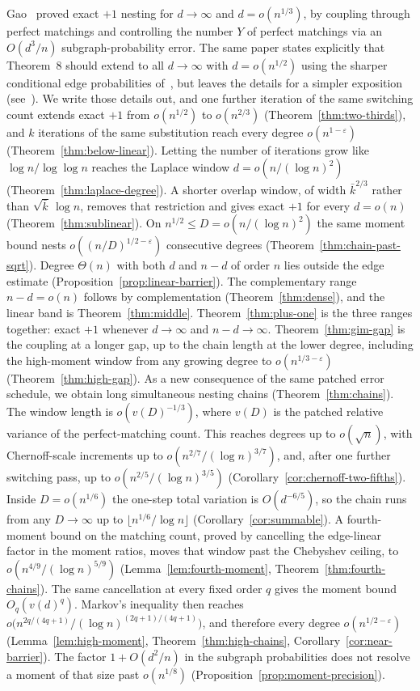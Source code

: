 \documentclass[11pt]{article}
\begin{document}
Gao~\cite{Gao21} proved exact \(+1\) nesting for \(d\to\infty\) and \(d=o(n^{1/3})\),
by coupling through perfect matchings and controlling the number \(Y\) of perfect
matchings via an \(O(d^3/n)\) subgraph-probability error.
The same paper states explicitly that Theorem~8 should extend to all
\(d\to\infty\) with \(d=o(n^{1/2})\) using the sharper conditional edge probabilities
of~\cite{Gao20}, but leaves the details for a simpler exposition
(see~\cite[Remark~16(b), §5]{Gao21}).
We write those details out, and one further iteration of the same switching count extends exact \(+1\) from \(o(n^{1/2})\) to \(o(n^{2/3})\) (Theorem~\ref{thm:two-thirds}),
and \(k\) iterations of the same substitution reach every degree
\(o(n^{1-\varepsilon})\) (Theorem~\ref{thm:below-linear}).
Letting the number of iterations grow like \(\log n/\log\log n\) reaches the
Laplace window \(d=o(n/(\log n)^2)\) (Theorem~\ref{thm:laplace-degree}).
A shorter overlap window, of width \(\bar k^{2/3}\) rather than \(\sqrt{\bar k}\,\log n\),
removes that restriction and gives exact \(+1\) for every \(d=o(n)\)
(Theorem~\ref{thm:sublinear}).
On \(n^{1/2}\le D=o(n/(\log n)^2)\) the same moment bound nests
\(o((n/D)^{1/2-\varepsilon})\) consecutive degrees
(Theorem~\ref{thm:chain-past-sqrt}).
Degree \(\Theta(n)\) with both \(d\) and \(n-d\) of order \(n\) lies outside the edge
estimate (Proposition~\ref{prop:linear-barrier}). The complementary range
\(n-d=o(n)\) follows by complementation (Theorem~\ref{thm:dense}), and the linear band is Theorem~\ref{thm:middle}.
Theorem~\ref{thm:plus-one} is the three ranges together: exact \(+1\) whenever \(d\to\infty\) and \(n-d\to\infty\).
Theorem~\ref{thm:gim-gap} is the coupling at a longer gap, up to the chain length at the lower degree, including the high-moment window from any growing degree to \(o(n^{1/3-\varepsilon})\) (Theorem~\ref{thm:high-gap}).
As a new consequence of the same patched error schedule, we obtain long
simultaneous nesting chains (Theorem~\ref{thm:chains}). The window length is
\(o(v(D)^{-1/3})\), where \(v(D)\) is the patched relative variance of the
perfect-matching count. This reaches degrees up to \(o(\sqrt{n})\),
with Chernoff-scale increments up to \(o(n^{2/7}/(\log n)^{3/7})\),
and, after one further switching pass, up to \(o(n^{2/5}/(\log n)^{3/5})\)
(Corollary~\ref{cor:chernoff-two-fifths}).
Inside \(D=o(n^{1/6})\) the one-step total variation is \(O(d^{-6/5})\), so the
chain runs from any \(D\to\infty\) up to \(\lfloor n^{1/6}/\log n\rfloor\)
(Corollary~\ref{cor:summable}).
A fourth-moment bound on the matching count, proved by cancelling the
edge-linear factor in the moment ratios, moves that window past the Chebyshev
ceiling, to \(o(n^{4/9}/(\log n)^{5/9})\)
(Lemma~\ref{lem:fourth-moment}, Theorem~\ref{thm:fourth-chains}).
The same cancellation at every fixed order \(q\) gives the moment bound
\(O_q(v(d)^q)\). Markov's inequality then reaches
\(o\bigl(n^{2q/(4q+1)}/(\log n)^{(2q+1)/(4q+1)}\bigr)\), and therefore every
degree \(o(n^{1/2-\varepsilon})\) (Lemma~\ref{lem:high-moment},
Theorem~\ref{thm:high-chains}, Corollary~\ref{cor:near-barrier}).
The factor \(1+O(d^2/n)\) in the subgraph probabilities does not resolve a moment of
that size past \(o(n^{1/8})\) (Proposition~\ref{prop:moment-precision}).
\end{document}
